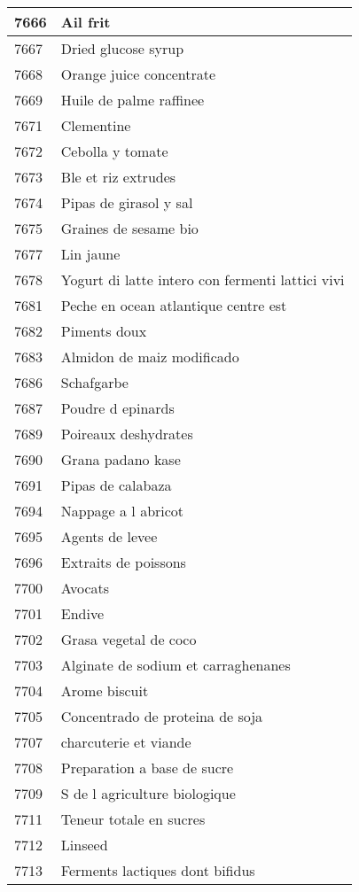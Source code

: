 \begin{longtable}{|l|l|}
7666 & Ail frit \\ \hline 
7667 & Dried glucose syrup \\ \hline 
7668 & Orange juice concentrate \\ \hline 
7669 & Huile de palme raffinee \\ \hline 
7671 & Clementine \\ \hline 
7672 & Cebolla y tomate \\ \hline 
7673 & Ble et riz extrudes \\ \hline 
7674 & Pipas de girasol y sal \\ \hline 
7675 & Graines de sesame bio \\ \hline 
7677 & Lin jaune \\ \hline 
7678 & Yogurt di latte intero con fermenti lattici vivi \\ \hline 
7681 & Peche en ocean atlantique centre est \\ \hline 
7682 & Piments doux \\ \hline 
7683 & Almidon de maiz modificado \\ \hline 
7686 & Schafgarbe \\ \hline 
7687 & Poudre d epinards \\ \hline 
7689 & Poireaux deshydrates \\ \hline 
7690 & Grana padano kase \\ \hline 
7691 & Pipas de calabaza \\ \hline 
7694 & Nappage a l abricot \\ \hline 
7695 & Agents de levee \\ \hline 
7696 & Extraits de poissons \\ \hline 
7700 & Avocats \\ \hline 
7701 & Endive \\ \hline 
7702 & Grasa vegetal de coco \\ \hline 
7703 & Alginate de sodium et carraghenanes \\ \hline 
7704 & Arome biscuit \\ \hline 
7705 & Concentrado de proteina de soja \\ \hline 
7707 & charcuterie et viande \\ \hline 
7708 & Preparation a base de sucre \\ \hline 
7709 & S de l agriculture biologique \\ \hline 
7711 & Teneur totale en sucres \\ \hline 
7712 & Linseed \\ \hline 
7713 & Ferments lactiques dont bifidus \\ \hline 

\end{longtable}
